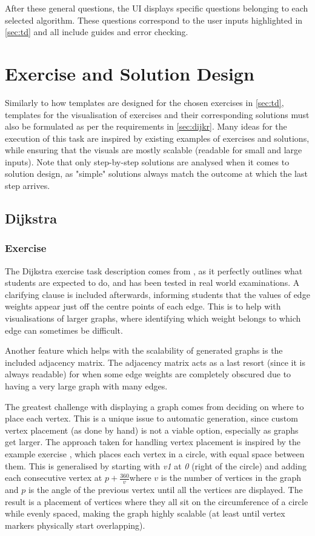 \documentclass{l4proj}
\begin{document}
After these general questions, the UI displays specific questions belonging to each selected algorithm. These questions correspond to the user inputs highlighted in \autoref{sec:td} and all include guides and error checking.

\section{Exercise and Solution Design}

\cite{a}

Similarly to how templates are designed for the chosen exercises in \autoref{sec:td}, templates for the visualisation of exercises and their corresponding solutions must also be formulated as per the requirements in \autoref{sec:dijkr}. Many ideas for the execution of this task are inspired by existing examples of exercises and solutions, while ensuring that the visuals are mostly scalable (readable for small and large inputs). Note that only step-by-step solutions are analysed when it comes to solution design, as "simple" solutions always match the outcome at which the last step arrives.

\subsection{Dijkstra}
\subsubsection{Exercise}
\label{sec:dijkstraExerciseDesign}

The Dijkstra exercise task description comes from \cite{a}, as it perfectly outlines what students are expected to do, and has been tested in real world examinations. A clarifying clause is included afterwards, informing students that the values of edge weights appear just off the centre points of each edge. This is to help with visualisations of larger graphs, where identifying which weight belongs to which edge can sometimes be difficult.

Another feature which helps with the scalability of generated graphs is the included adjacency matrix. The adjacency matrix acts as a last resort (since it is always readable) for when some edge weights are completely obscured due to having a very large graph with many edges. 

The greatest challenge with displaying a graph comes from deciding on where to place each vertex. This is a unique issue to automatic generation, since custom vertex placement (as done by hand) is not a viable option, especially as graphs get larger. The approach taken for handling vertex placement is inspired by the example exercise \cite{a}, which places each vertex in a circle, with equal space between them. This is generalised by starting with \emph{v1} at \emph{0 \textdegree} (right of the circle) and adding each consecutive vertex at $p+\frac{360 }{v}$\textdegree where $v$ is the number of vertices in the graph and $p$ is the angle of the previous vertex until all the vertices are displayed. The result is a placement of vertices where they all sit on the circumference of a circle while evenly spaced, making the graph highly scalable (at least until vertex markers physically start overlapping).
\end{document}
